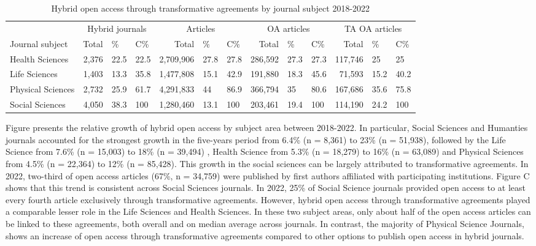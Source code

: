 \documentclass[a4paper,man,floatsintext,longtable,noextraspace,12pt]{apa6}
\begin{document}
\begin{table}[H]

\caption{\label{tab:subject_summary_table}Hybrid open access through transformative agreements by journal subject 2018-2022}
\centering
\begin{tabular}[t]{lrllrllrllrll}
\toprule
\multicolumn{1}{c}{ } & \multicolumn{3}{c}{Hybrid journals} & \multicolumn{3}{c}{Articles} & \multicolumn{3}{c}{OA articles} & \multicolumn{3}{c}{TA OA articles} \\
\cmidrule(l{3pt}r{3pt}){2-4} \cmidrule(l{3pt}r{3pt}){5-7} \cmidrule(l{3pt}r{3pt}){8-10} \cmidrule(l{3pt}r{3pt}){11-13}
Journal subject & Total & \% & C\% & Total & \% & C\% & Total & \% & C\% & Total & \% & C\%\\
\midrule
Health Sciences & 2,376 & 22.5 & 22.5 & 2,709,906 & 27.8 & 27.8 & 286,592 & 27.3 & 27.3 & 117,746 & 25 & 25\\
Life Sciences & 1,403 & 13.3 & 35.8 & 1,477,808 & 15.1 & 42.9 & 191,880 & 18.3 & 45.6 & 71,593 & 15.2 & 40.2\\
Physical Sciences & 2,732 & 25.9 & 61.7 & 4,291,833 & 44 & 86.9 & 366,794 & 35 & 80.6 & 167,686 & 35.6 & 75.8\\
Social Sciences & 4,050 & 38.3 & 100 & 1,280,460 & 13.1 & 100 & 203,461 & 19.4 & 100 & 114,190 & 24.2 & 100\\
\bottomrule
\end{tabular}
\end{table}

Figure presents the relative growth of hybrid open access by subject
area between 2018-2022. In particular, Social Sciences and Humanties
journals accounted for the strongest growth in the five-years period
from 6.4\% (n = 8,361) to 23\% (n = 51,938), followed by the Life
Science from 7.6\% (n = 15,003) to 18\% (n = 39,494) , Health Science
from 5.3\% (n = 18,279) to 16\% (n = 63,089) and Physical Sciences from
4.5\% (n = 22,364) to 12\% (n = 85,428). This growth in the social
sciences can be largely attributed to transformative agreements. In
2022, two-third of open access articles (67\%, n = 34,759) were
published by first authors affiliated with participating institutions.
Figure C shows that this trend is consistent across Social Sciences
journals. In 2022, 25\% of Social Science journals provided open access
to at least every fourth article exclusively through transformative
agreements. However, hybrid open access through transformative
agreements played a comparable lesser role in the Life Sciences and
Health Sciences. In these two subject areas, only about half of the open
access articles can be linked to these agreements, both overall and on
median average across journals. In contrast, the majority of Physical
Science Journals, shows an increase of open access through
transformative agreements compared to other options to publish open
access in hybrid journals.
\end{document}
